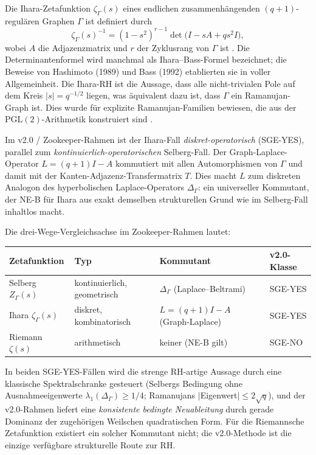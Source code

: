 \documentclass[12pt,a4paper]{article}
\theoremstyle{definition}
\theoremstyle{remark}
\newcommand{\Delop}{\Delta_{\Gamma}}
\begin{document}
Die Ihara-Zetafunktion $\zeta_\Gamma(s)$ eines endlichen zusammenhängenden $(q+1)$-regulären
Graphen $\Gamma$ ist definiert durch
\begin{equation}
\zeta_\Gamma(s)^{-1}
  = (1-s^2)^{r-1}\det\!\bigl(I - sA + qs^2 I\bigr),
\end{equation}
wobei $A$ die Adjazenzmatrix und $r$ der Zyklusrang von $\Gamma$ ist
\cite{Ihara1966,Hashimoto1989,Bass1992}.  Die Determinantenformel
wird manchmal als Ihara--Bass-Formel bezeichnet; die Beweise von Hashimoto (1989)
und Bass (1992) etablierten sie in voller Allgemeinheit.  Die Ihara-RH ist die Aussage, dass alle
nicht-trivialen Pole auf dem Kreis $|s| = q^{-1/2}$ liegen, was äquivalent dazu ist, dass
$\Gamma$ ein Ramanujan-Graph ist.  Dies wurde für explizite
Ramanujan-Familien bewiesen, die aus der $\mathrm{PGL}(2)$-Arithmetik konstruiert sind
\cite{LPS1988}.

\medskip
Im v2.0 / Zookeeper-Rahmen ist der Ihara-Fall \emph{diskret-operatorisch}
(SGE-YES), parallel zum \emph{kontinuierlich-operatorischen} Selberg-Fall.
Der Graph-Laplace-Operator $L = (q+1)I - A$ kommutiert mit allen Automorphismen von $\Gamma$
und damit mit der Kanten-Adjazenz-Transfermatrix $T$.  Dies macht $L$ zum
diskreten Analogon des hyperbolischen Laplace-Operators $\Delta_\Gamma$: ein universeller
Kommutant, der NE-B für Ihara aus exakt demselben strukturellen Grund wie im Selberg-Fall inhaltlos macht.

Die drei-Wege-Vergleichsachse im Zookeeper-Rahmen lautet:

\begin{center}
\footnotesize
\setlength{\tabcolsep}{4pt}
\begin{tabularx}{\textwidth}{@{}L{2.4cm}L{2.4cm}Y L{2.0cm}@{}}
\toprule
\textbf{Zetafunktion} & \textbf{Typ} & \textbf{Kommutant} & \textbf{v2.0-Klasse} \\
\midrule
Selberg $Z_\Gamma(s)$ & kontinuierlich, geometrisch & $\Delta_\Gamma$ (Laplace--Beltrami) & SGE-YES \\
Ihara $\zeta_\Gamma(s)$ & diskret, kombinatorisch & $L = (q{+}1)I - A$ (Graph-Laplace) & SGE-YES \\
Riemann $\zeta(s)$ & arithmetisch & keiner (NE-B gilt) & SGE-NO \\
\bottomrule
\end{tabularx}
\end{center}

\medskip\noindent
In beiden SGE-YES-Fällen wird die strenge RH-artige Aussage durch eine klassische
Spektralschranke gesteuert (Selbergs Bedingung ohne Ausnahmeeigenwerte
$\lambda_1(\Delop)\ge 1/4$; Ramanujans $|$Eigenwert$| \le 2\sqrt{q}$),
und der v2.0-Rahmen liefert eine \emph{konsistente bedingte Neuableitung} durch gerade Dominanz
der zugehörigen Weilschen quadratischen Form.  Für die Riemannsche Zetafunktion existiert
ein solcher Kommutant nicht; die v2.0-Methode ist die einzige verfügbare strukturelle Route zur RH.
\end{document}
